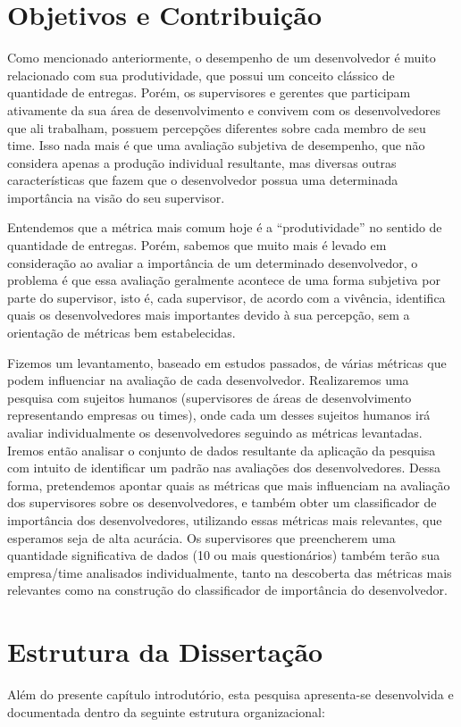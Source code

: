 \section{Objetivos e Contribuição}
Como mencionado anteriormente, o desempenho de um desenvolvedor é muito relacionado com sua produtividade, que possui um conceito clássico de quantidade de entregas. Porém, os supervisores e gerentes que participam ativamente da sua área de desenvolvimento e convivem com os desenvolvedores que ali trabalham, possuem percepções diferentes sobre cada membro de seu time. Isso nada mais é que uma avaliação subjetiva de desempenho, que não considera apenas a produção individual resultante, mas diversas outras características que fazem que o desenvolvedor possua uma determinada importância na visão do seu supervisor.

Entendemos que a métrica mais comum hoje é a “produtividade” no sentido de quantidade de entregas. Porém, sabemos que muito mais é levado em consideração ao avaliar a importância de um determinado desenvolvedor, o problema é que essa avaliação geralmente acontece de uma forma subjetiva por parte do supervisor, isto é, cada supervisor, de acordo com a vivência, identifica quais os desenvolvedores mais importantes devido à sua percepção, sem a orientação de métricas bem estabelecidas.

Fizemos um levantamento, baseado em estudos passados, de várias métricas que podem influenciar na avaliação de cada desenvolvedor. Realizaremos uma pesquisa com sujeitos humanos (supervisores de áreas de desenvolvimento representando empresas ou times), onde cada um desses sujeitos humanos irá avaliar individualmente os desenvolvedores seguindo as métricas levantadas. Iremos então analisar o conjunto de dados resultante da aplicação da pesquisa com intuito de identificar um padrão nas avaliações dos desenvolvedores. Dessa forma, pretendemos apontar quais as métricas que mais influenciam na avaliação dos supervisores sobre os desenvolvedores, e também obter um classificador de importância dos desenvolvedores, utilizando essas métricas mais relevantes, que esperamos seja de alta acurácia. Os supervisores que preencherem uma quantidade significativa de dados (10 ou mais questionários) também terão sua empresa/time analisados individualmente, tanto na descoberta das métricas mais relevantes como na construção do classificador de importância do desenvolvedor.


\section{Estrutura da Dissertação}
Além do presente capítulo introdutório, esta pesquisa apresenta-se desenvolvida e documentada dentro da seguinte estrutura organizacional:

